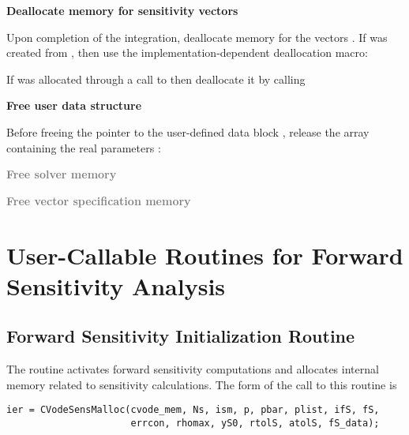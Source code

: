 \begin{Steps}
\item 
  {\bf Deallocate memory for sensitivity vectors}

  Upon completion of the integration, deallocate memory for the vectors . 
  If  was created from , then use the implementation-dependent 
  {\nvector} deallocation macro:

  {\s} 

  {\p} 

  If  was allocated through a call to  then deallocate
  it by calling 
  
\item
  {\bf Free user data structure}

  Before freeing the pointer to the user-defined data block 
  , release the array containing the real parameters :

\item
  \textcolor{gray}{\bf Free solver memory}
  
\item
  \textcolor{gray}{\bf Free vector specification memory}

\end{Steps}

\section{User-Callable Routines for Forward Sensitivity Analysis}

\subsection{Forward Sensitivity Initialization Routine}\label{sss:cvodesensmalloc}

The routine  activates forward sensitivity computations and
allocates internal memory related to sensitivity calculations.
The form of the call to this routine is
\begin{verbatim}
ier = CVodeSensMalloc(cvode_mem, Ns, ism, p, pbar, plist, ifS, fS,
                      errcon, rhomax, yS0, rtolS, atolS, fS_data);
\end{verbatim}

